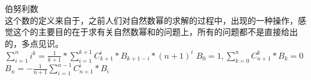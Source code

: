 \documentclass[a4paper,11pt]{article}
\begin{document}
\begin{CJK}{UTF8}{gbsn}
伯努利数\\
这个数的定义来自于，之前人们对自然数幂的求解的过程中，出现的一种操作，感觉这个的主要目的在于求有关自然数幂和的问题上，所有的问题都不是直接给出的，多点见识。\\
$\sum_{i=1}^n i^k = \frac{1}{k+1}*\sum_{i = 1}^{k+1}C_{k+1}^i*B_{k+1-i}*(n+1)^i$ \qquad $B_0 = 1,\sum^n_{k = 0}C_{n+1}^k*B_k = 0$ \qquad $B_n = -\frac{1}{n+1}\sum_{i=1}^{n-1}C_{n+1}^i*B_i$
\inputminted{c++}{../scoure/math/bo.cpp}
\end{CJK}
\end{document}
